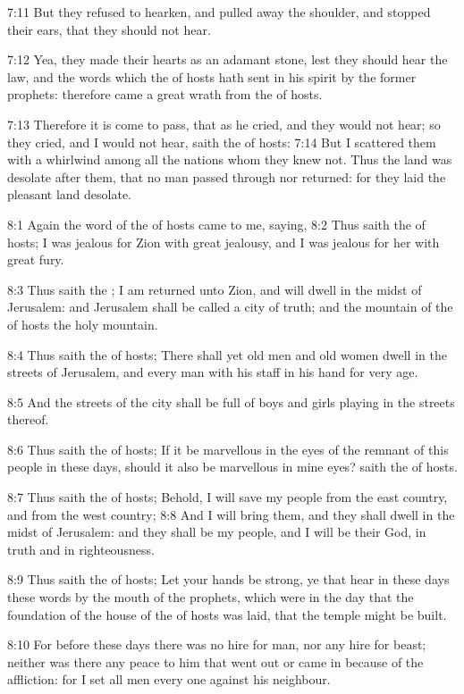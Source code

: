 7:11 But they refused to hearken, and pulled away the shoulder, and
stopped their ears, that they should not hear.

7:12 Yea, they made their hearts as an adamant stone, lest they should
hear the law, and the words which the \LORD of hosts hath sent in his
spirit by the former prophets: therefore came a great wrath from the
\LORD of hosts.

7:13 Therefore it is come to pass, that as he cried, and they would
not hear; so they cried, and I would not hear, saith the \LORD of
hosts: 7:14 But I scattered them with a whirlwind among all the
nations whom they knew not. Thus the land was desolate after them,
that no man passed through nor returned: for they laid the pleasant
land desolate.

8:1 Again the word of the \LORD of hosts came to me, saying, 8:2 Thus
saith the \LORD of hosts; I was jealous for Zion with great jealousy,
and I was jealous for her with great fury.

8:3 Thus saith the \LORD; I am returned unto Zion, and will dwell in
the midst of Jerusalem: and Jerusalem shall be called a city of truth;
and the mountain of the \LORD of hosts the holy mountain.

8:4 Thus saith the \LORD of hosts; There shall yet old men and old
women dwell in the streets of Jerusalem, and every man with his staff
in his hand for very age.

8:5 And the streets of the city shall be full of boys and girls
playing in the streets thereof.

8:6 Thus saith the \LORD of hosts; If it be marvellous in the eyes of
the remnant of this people in these days, should it also be marvellous
in mine eyes? saith the \LORD of hosts.

8:7 Thus saith the \LORD of hosts; Behold, I will save my people from
the east country, and from the west country; 8:8 And I will bring
them, and they shall dwell in the midst of Jerusalem: and they shall
be my people, and I will be their God, in truth and in righteousness.

8:9 Thus saith the \LORD of hosts; Let your hands be strong, ye that
hear in these days these words by the mouth of the prophets, which
were in the day that the foundation of the house of the \LORD of hosts
was laid, that the temple might be built.

8:10 For before these days there was no hire for man, nor any hire for
beast; neither was there any peace to him that went out or came in
because of the affliction: for I set all men every one against his
neighbour.

